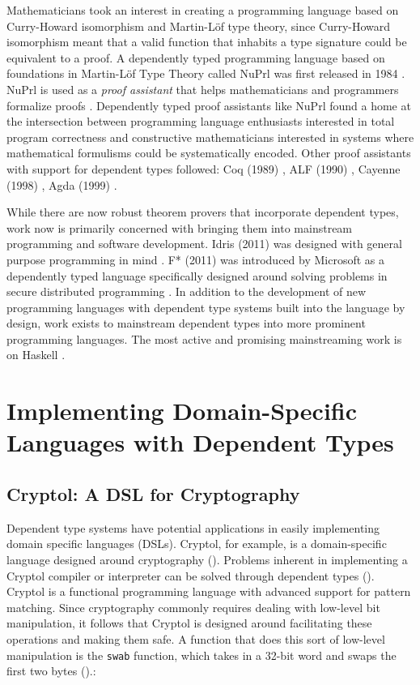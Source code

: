 Mathematicians took an interest in creating a programming language based on
Curry-Howard isomorphism and Martin-L\"{o}f type theory, since Curry-Howard
isomorphism meant that a valid function that inhabits a type signature could be
equivalent to a proof. A dependently typed programming language based on
foundations in Martin-L\"{o}f Type Theory called NuPrl was first released in
1984 \cite{nuprl}. NuPrl is used as a \textit{proof assistant} that helps
mathematicians and programmers formalize proofs \cite{prl_home}. Dependently
typed proof assistants like NuPrl found a home at the intersection between
programming language enthusiasts interested in total program correctness and
constructive mathematicians interested in systems where mathematical formulisms
could be systematically encoded. Other proof assistants with support for
dependent types followed: Coq (1989) \cite{girard1989proofs}, ALF (1990)
\cite{Magnusson95theimplementation}, Cayenne (1998)
\cite{Augustsson:1998:CLD:291251.289451}, Agda (1999)
\cite{structured_type_theory}.

While there are now robust theorem provers that incorporate dependent types,
work now is primarily concerned with bringing them into mainstream programming
and software development. Idris (2011) was designed with general purpose
programming in mind \cite{tdd_book}. F* (2011) was introduced by Microsoft as a
dependently typed language specifically designed around solving problems in
secure distributed programming \cite{fstar_distributed_programming}. In addition
to the development of new programming languages with dependent type systems
built into the language by design, work exists to mainstream dependent types
into more prominent programming languages. The most active and promising
mainstreaming work is on Haskell \cite{eisenberg2016, gundry2013}. 

\section{Implementing Domain-Specific Languages with Dependent Types}

\subsection{Cryptol: A DSL for Cryptography}

Dependent type systems have potential applications in easily implementing domain
specific languages (DSLs). Cryptol, for example, is a domain-specific language
designed around cryptography (\cite{cryptol_manual}). Problems inherent in
implementing a Cryptol compiler or interpreter can be solved through dependent
types (\cite{power_of_pi}). Cryptol is a functional programming language with
advanced support for pattern matching. Since cryptography commonly requires
dealing with low-level bit manipulation, it follows that Cryptol is designed
around facilitating these operations and making them safe. A function that does
this sort of low-level manipulation is the \texttt{swab} function, which takes
in a 32-bit word and swaps the first two bytes (\cite{cryptol_manual}).: 

